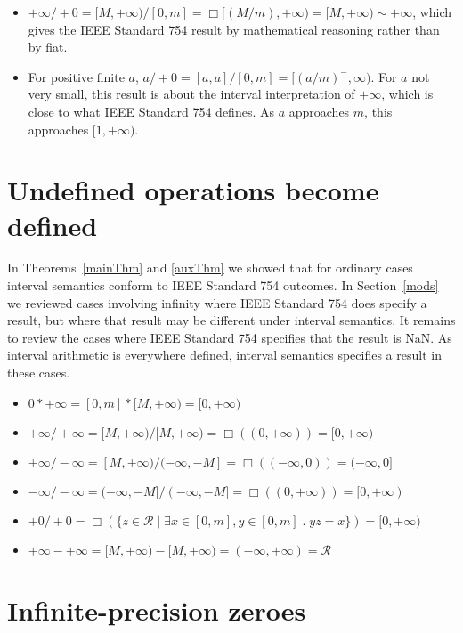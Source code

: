 \documentclass[11pt]{article}
\newcommand{\R}{\mathcal{R}}
\begin{document}
\begin{itemize}
way.  For $a$ equal to one, it is the interval interpretation of
$+\infty$.  As $a$ increases, the lower bound of the result of
$\infty/a$ decreases until the result becomes $[1,+\infty)$ for the
greatest finite value of $a$.  This is in accordance with the notion
that the interval interpretation of $\infty$ is not infinitely
precise.
\item $+\infty/+0 = [M,+\infty)/[0,m] = \Box [(M/m),+\infty) =
  [M,+\infty) \sim +\infty$,
which gives the IEEE Standard 754 result by mathematical reasoning rather than
by fiat.
\item
For positive finite $a$,
$a/+0 = [a,a]/[0,m] = [(a/m)^-, \infty)$.
For $a$ not very small, this result is about the interval
interpretation of $+\infty$, which is close to what IEEE Standard 754 defines.
As $a$ approaches $m$, this approaches $[1,+\infty)$.
\end{itemize}

\section{Undefined operations become defined}
\label{undefDef}

In Theorems~\ref{mainThm} and \ref{auxThm} we showed that for ordinary
cases interval semantics conform to IEEE Standard 754 outcomes.  In
Section~\ref{mods} we reviewed cases involving infinity where IEEE
Standard 754 does specify a result, but where that result may be
different under interval semantics. It remains to review the cases
where IEEE Standard 754 specifies that the result is NaN. As interval
arithmetic is everywhere defined, interval semantics specifies a
result in these cases.
\begin{itemize}
\item
$0 * +\infty = [0,m]*[M,+\infty) = [0,+\infty)$
\item
$+\infty/+\infty = [M,+\infty)/[M,+\infty) = \Box((0,+\infty)) = [0,+\infty)$
\item
$+\infty/-\infty = [M,+\infty)/(-\infty,-M] = \Box((-\infty,0)) = (-\infty,0]$
\item
$-\infty/-\infty = (-\infty,-M]/(-\infty,-M] = \Box((0,+\infty)) =
[0,+\infty)$
\item
$+0/+0 = \Box(\{z \in \R  \mid \exists x \in [0,m], y \in [0,m] \;.\;
yz = x \}) = [0,+\infty)$
\item
$+\infty - +\infty = [M,+\infty) - [M,+\infty) = (-\infty, +\infty) = \R$
\end{itemize}

\section{Infinite-precision zeroes}
\label{altSem}
\end{document}
